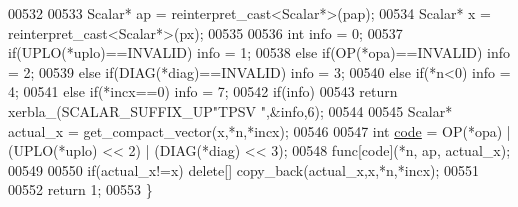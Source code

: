 \begin{DoxyCode}
00532 
00533   Scalar* ap = \textcolor{keyword}{reinterpret\_cast<}Scalar*\textcolor{keyword}{>}(pap);
00534   Scalar* x = \textcolor{keyword}{reinterpret\_cast<}Scalar*\textcolor{keyword}{>}(px);
00535 
00536   \textcolor{keywordtype}{int} info = 0;
00537   \textcolor{keywordflow}{if}(UPLO(*uplo)==INVALID)                                            info = 1;
00538   \textcolor{keywordflow}{else} \textcolor{keywordflow}{if}(OP(*opa)==INVALID)                                          info = 2;
00539   \textcolor{keywordflow}{else} \textcolor{keywordflow}{if}(DIAG(*diag)==INVALID)                                       info = 3;
00540   \textcolor{keywordflow}{else} \textcolor{keywordflow}{if}(*n<0)                                                       info = 4;
00541   \textcolor{keywordflow}{else} \textcolor{keywordflow}{if}(*incx==0)                                                   info = 7;
00542   \textcolor{keywordflow}{if}(info)
00543     \textcolor{keywordflow}{return} xerbla\_(SCALAR\_SUFFIX\_UP\textcolor{stringliteral}{"TPSV "},&info,6);
00544 
00545   Scalar* actual\_x = get\_compact\_vector(x,*n,*incx);
00546 
00547   \textcolor{keywordtype}{int} \hyperlink{structcode}{code} = OP(*opa) | (UPLO(*uplo) << 2) | (DIAG(*diag) << 3);
00548   func[code](*n, ap, actual\_x);
00549 
00550   \textcolor{keywordflow}{if}(actual\_x!=x) \textcolor{keyword}{delete}[] copy\_back(actual\_x,x,*n,*incx);
00551 
00552   \textcolor{keywordflow}{return} 1;
00553 \}
\end{DoxyCode}
